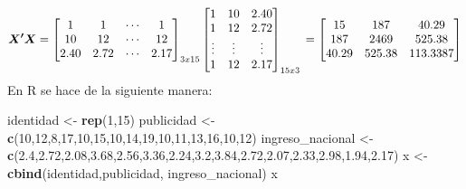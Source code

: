 \documentclass[
]{book}
\newenvironment{Shaded}{\begin{snugshade}}{\end{snugshade}}
\newcommand{\DecValTok}[1]{\textcolor[rgb]{0.00,0.00,0.81}{#1}}
\newcommand{\FloatTok}[1]{\textcolor[rgb]{0.00,0.00,0.81}{#1}}
\newcommand{\FunctionTok}[1]{\textcolor[rgb]{0.13,0.29,0.53}{\textbf{#1}}}
\newcommand{\NormalTok}[1]{#1}
\newcommand{\OtherTok}[1]{\textcolor[rgb]{0.56,0.35,0.01}{#1}}
\begin{document}
\[
\begin{equation}
\boldsymbol{X'X}=\begin{bmatrix}
 1&  1&  \cdots& 1\\ 
 10&  12&  \cdots& 12\\ 
 2.40&  2.72&  \cdots&  2.17
\end{bmatrix}_{3x15}
\begin{bmatrix}
 1&  10& 2.40\\ 
 1&  12& 2.72\\ 
 \vdots &  \vdots& \vdots\\ 
 1&  12& 2.17
\end{bmatrix}_{15x3} \\
= \begin{bmatrix}
 15&   187 & 40.29\\ 
 187&   2469& 525.38\\ 
 40.29  &  525.38 & 113.3387
\end{bmatrix}
\end{equation}
\] En R se hace de la siguiente manera:

\begin{Shaded}
\begin{Highlighting}[]
\NormalTok{identidad }\OtherTok{\textless{}{-}}  \FunctionTok{rep}\NormalTok{(}\DecValTok{1}\NormalTok{,}\DecValTok{15}\NormalTok{)}
\NormalTok{publicidad }\OtherTok{\textless{}{-}} \FunctionTok{c}\NormalTok{(}\DecValTok{10}\NormalTok{,}\DecValTok{12}\NormalTok{,}\DecValTok{8}\NormalTok{,}\DecValTok{17}\NormalTok{,}\DecValTok{10}\NormalTok{,}\DecValTok{15}\NormalTok{,}\DecValTok{10}\NormalTok{,}\DecValTok{14}\NormalTok{,}\DecValTok{19}\NormalTok{,}\DecValTok{10}\NormalTok{,}\DecValTok{11}\NormalTok{,}\DecValTok{13}\NormalTok{,}\DecValTok{16}\NormalTok{,}\DecValTok{10}\NormalTok{,}\DecValTok{12}\NormalTok{)}
\NormalTok{ingreso\_nacional }\OtherTok{\textless{}{-}} \FunctionTok{c}\NormalTok{(}\FloatTok{2.4}\NormalTok{,}\FloatTok{2.72}\NormalTok{,}\FloatTok{2.08}\NormalTok{,}\FloatTok{3.68}\NormalTok{,}\FloatTok{2.56}\NormalTok{,}\FloatTok{3.36}\NormalTok{,}\FloatTok{2.24}\NormalTok{,}\FloatTok{3.2}\NormalTok{,}\FloatTok{3.84}\NormalTok{,}\FloatTok{2.72}\NormalTok{,}\FloatTok{2.07}\NormalTok{,}\FloatTok{2.33}\NormalTok{,}\FloatTok{2.98}\NormalTok{,}\FloatTok{1.94}\NormalTok{,}\FloatTok{2.17}\NormalTok{)}
\NormalTok{x }\OtherTok{\textless{}{-}} \FunctionTok{cbind}\NormalTok{(identidad,publicidad, ingreso\_nacional)}
\NormalTok{x}
\end{Highlighting}
\end{Shaded}
\end{document}

